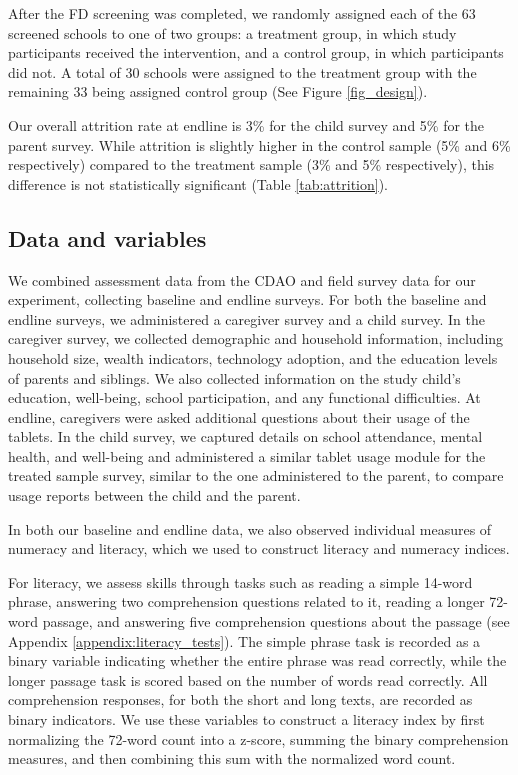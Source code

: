 \documentclass[hidelinks,12pt]{article}
\begin{document}
\begin{singlespace}
After the FD screening was completed, we randomly assigned each of the 63 screened schools to one of two groups: a treatment group, in which study participants received the intervention, and a control group, in which participants did not. A total of 30 schools were assigned to the treatment group with the remaining 33 being assigned control group (See Figure \ref{fig_design}). 

Our overall attrition rate at endline is 3\% for the child survey and 5\% for the parent survey. While attrition is slightly higher in the control sample (5\% and 6\% respectively) compared to the treatment sample (3\% and 5\% respectively), this difference is not statistically significant (Table \ref{tab:attrition}).


\subsection{Data and variables}\label{sec:data}
We combined assessment data from the CDAO and field survey data for our experiment, collecting baseline and endline surveys. For both the baseline and endline surveys, we administered a caregiver survey and a child survey. In the caregiver survey, we collected demographic and household information, including household size, wealth indicators, technology adoption, and the education levels of parents and siblings. We also collected information on the study child’s education, well-being, school participation, and any functional difficulties. At endline, caregivers were asked additional questions about their usage of the tablets. In the child survey, we captured details on school attendance, mental health, and well-being and administered a similar tablet usage module for the treated sample survey, similar to the one administered to the parent, to compare usage reports between the child and the parent. 

In both our baseline and endline data, we also observed individual measures of numeracy and literacy, which we used to construct literacy and numeracy indices.

For literacy, we assess skills through tasks such as reading a simple 14-word phrase, answering two comprehension questions related to it, reading a longer 72-word passage, and answering five comprehension questions about the passage (see Appendix \ref{appendix:literacy_tests}). The simple phrase task is recorded as a binary variable indicating whether the entire phrase was read correctly, while the longer passage task is scored based on the number of words read correctly. All comprehension responses, for both the short and long texts, are recorded as binary indicators. We use these variables to construct a literacy index by first normalizing the 72-word count into a z-score, summing the binary comprehension measures, and then combining this sum with the normalized word count. 


\end{singlespace}
\end{document}
